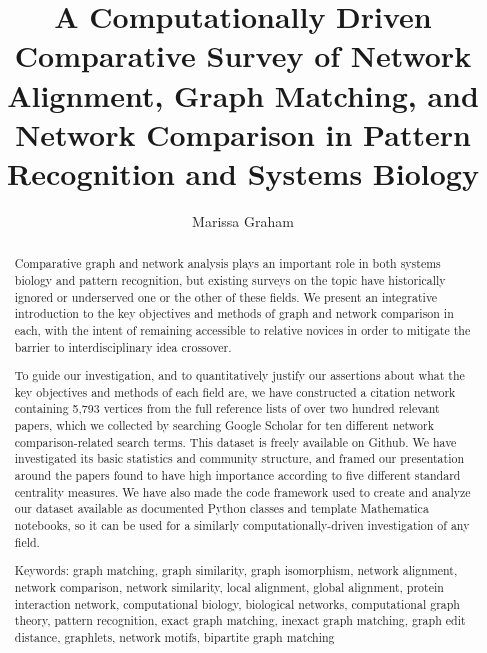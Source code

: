 \documentclass[12pt]{thesis}
\author{Marissa Graham}
\title{A Computationally Driven Comparative Survey of Network Alignment, Graph Matching, and Network Comparison in Pattern Recognition and Systems Biology}
\theoremstyle{plain}
\theoremstyle{definition}
\theoremstyle{remark}
\begin{document}








\frontmatter 
\maketitle 

\begin{abstract}

Comparative graph and network analysis plays an important role in both systems biology and pattern recognition, but existing surveys on the topic have historically ignored or underserved one or the other of these fields. We present an integrative introduction to the key objectives and methods of graph and network comparison in each, with the intent of remaining accessible to relative novices in order to mitigate the barrier to interdisciplinary idea crossover. 

To guide our investigation, and to quantitatively justify our assertions about what the key objectives and methods of each field are, we have constructed a citation network containing 5,793 vertices from the full reference lists of over two hundred relevant papers, which we collected by searching Google Scholar for ten different network comparison-related search terms. This dataset is freely available on Github. We have investigated its basic statistics and community structure, and framed our presentation around the papers found to have high importance according to five different standard centrality measures. We have also made the code framework used to create and analyze our dataset available as documented Python classes and template Mathematica notebooks, so it can be used for a similarly computationally-driven investigation of any field.

\vskip 2.75in
 
\noindent Keywords: %
graph matching, graph similarity, graph isomorphism, network alignment, network comparison, network similarity, local alignment, global alignment, protein interaction network, computational biology, biological networks, computational graph theory, pattern recognition, exact graph matching, inexact graph matching, graph edit distance, graphlets, network motifs, bipartite graph matching
\end{abstract}
\end{document}
